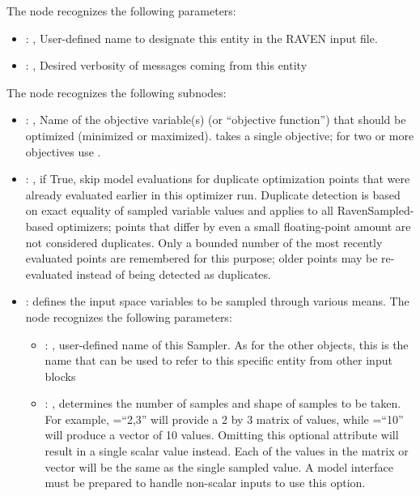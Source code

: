   The  node recognizes the following parameters:
    \begin{itemize}
      \item {}: ,
        User-defined name to designate this entity in the RAVEN input file.
      \item {}: ,
        Desired verbosity of messages coming from this entity
  \end{itemize}

  The  node recognizes the following subnodes:
  \begin{itemize}
    \item {}: ,
      Name of the objective variable(s) (or ``objective function'') that should be optimized
      (minimized or maximized).  takes a single objective; for two or more
      objectives use         .

    \item {}: ,
      if True, skip model evaluations for duplicate optimization points that were already
      evaluated earlier in this optimizer run. Duplicate detection is based on exact equality of
      sampled variable values and applies to all RavenSampled-based optimizers; points that differ
      by even a small floating-point amount are not considered duplicates. Only a bounded number
      of the most recently evaluated points are remembered for this purpose; older points may be
      re-evaluated instead of being detected as duplicates. 

    \item {}:
      defines the input space variables to be sampled through various means.
      The  node recognizes the following parameters:
        \begin{itemize}
          \item {}: ,
            user-defined name of this Sampler. \nb As for the other objects,               this is
            the name that can be used to refer to this specific entity from other input blocks
          \item {}: ,
            determines the number of samples and shape of samples               to be taken.  For
            example, =``2,3'' will provide a 2 by 3               matrix of values,
            while =``10'' will produce a vector of 10 values.               Omitting
            this optional attribute will result in a single scalar value instead.               Each
            of the values in the matrix or vector will be the same as the single sampled value.
            \nb A model interface must be prepared to handle non-scalar inputs to use this option.
      \end{itemize}


\end{itemize}
